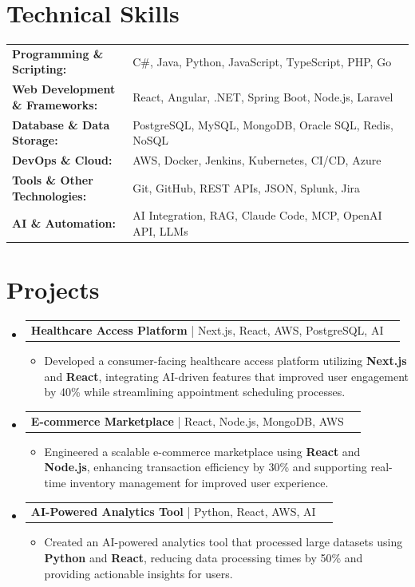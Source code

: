 \documentclass[letterpaper,10pt]{article}
\makeatletter
\newcommand{\resumeItem}[1]{
  \item{\fontsize{8pt}{9pt}\selectfont
    #1 \vspace{-3pt}
  }
}
\newcommand{\resumeProjectHeading}[2]{
    \item
    \begin{tabular*}{1.001\textwidth}{l@{\extracolsep{\fill}}r}
      \fontsize{8.5pt}{10pt}#1 & \textbf{\fontsize{8.5pt}{10pt} #2}\\
    \end{tabular*}\vspace{-7pt}
}
\newcommand{\resumeSubHeadingListStart}{\begin{itemize}[leftmargin=0pt, label={}]}
\newcommand{\resumeSubHeadingListEnd}{\end{itemize}}
\newcommand{\resumeItemListStart}{\begin{itemize}[leftmargin=*]}
\newcommand{\resumeItemListEnd}{\end{itemize}\vspace{-5pt}}
\makeatother
\begin{document}
\section{Technical Skills}
        \vspace{-14pt}
        \begin{table}[h]
            \fontsize{8pt}{9pt}\selectfont
            \begin{tabular}{p{0.3\linewidth} p{0.7\linewidth}}
                \textbf{Programming \& Scripting:} & C\#, Java, Python, JavaScript, TypeScript, PHP, Go \\
                \textbf{Web Development \& Frameworks:} & React, Angular, .NET, Spring Boot, Node.js, Laravel \\
                \textbf{Database \& Data Storage:} & PostgreSQL, MySQL, MongoDB, Oracle SQL, Redis, NoSQL \\
                \textbf{DevOps \& Cloud:} & AWS, Docker, Jenkins, Kubernetes, CI/CD, Azure \\
                \textbf{Tools \& Other Technologies:} & Git, GitHub, REST APIs, JSON, Splunk, Jira \\
                \textbf{AI \& Automation:} & AI Integration, RAG, Claude Code, MCP, OpenAI API, LLMs \\
            \end{tabular}
        \end{table}
 \vspace{-18pt}

\section{Projects}
    \vspace{-5pt}
    \resumeSubHeadingListStart
          \resumeProjectHeading
            {\textbf{Healthcare Access Platform} | Next.js, React, AWS, PostgreSQL, AI}{}
            \resumeItemListStart
                \resumeItem{Developed a consumer-facing healthcare access platform utilizing \textbf{Next.js} and \textbf{React}, integrating AI-driven features that improved user engagement by 40\% while streamlining appointment scheduling processes.}
            \resumeItemListEnd
        \vspace{-12pt}
    
        \resumeProjectHeading
            {\textbf{E-commerce Marketplace} | React, Node.js, MongoDB, AWS}{}
        \resumeItemListStart
                \resumeItem{Engineered a scalable e-commerce marketplace using \textbf{React} and \textbf{Node.js}, enhancing transaction efficiency by 30\% and supporting real-time inventory management for improved user experience.}
        \resumeItemListEnd
      \vspace{-12pt}
      \resumeProjectHeading
        {\textbf{AI-Powered Analytics Tool} | Python, React, AWS, AI}{}
    \resumeItemListStart
            \resumeItem{Created an AI-powered analytics tool that processed large datasets using \textbf{Python} and \textbf{React}, reducing data processing times by 50\% and providing actionable insights for users.}
    \resumeItemListEnd
    \resumeSubHeadingListEnd
\end{document}

